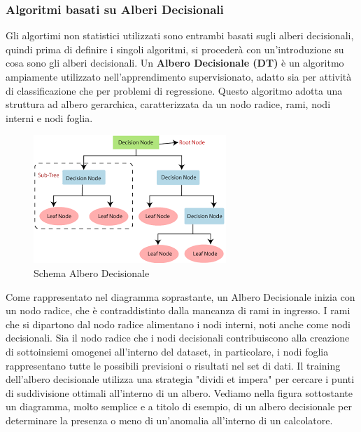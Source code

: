 \subsubsection{{Algoritmi basati su Alberi Decisionali}}
Gli algortimi non statistici utilizzati sono entrambi basati sugli alberi decisionali, quindi prima di definire i singoli algoritmi, si proceder\`a con un'introduzione su cosa sono gli alberi decisionali. Un \textbf{Albero Decisionale (DT)} \`e un algoritmo ampiamente utilizzato nell'apprendimento supervisionato, adatto sia per attivit\`a di classificazione che per problemi di regressione. Questo algoritmo adotta una struttura ad albero gerarchica, caratterizzata da un nodo radice, rami, nodi interni e nodi foglia\cite{dt}.
\begin{figure}[H]
    \centering
    \includegraphics[width=0.6\linewidth]{DT.png}
    \caption{Schema Albero Decisionale}
    \label{fig:enter-label}
\end{figure}

\vspace{1cm}

Come rappresentato nel diagramma soprastante, un Albero Decisionale inizia con un nodo radice, che \`e contraddistinto dalla mancanza di rami in ingresso. I rami che si dipartono dal nodo radice alimentano i nodi interni, noti anche come nodi decisionali.  Sia il nodo radice che i nodi decisionali contribuiscono alla creazione di sottoinsiemi omogenei all'interno del dataset, in particolare, i nodi foglia rappresentano tutte le possibili previsioni o risultati nel set di dati. 
Il training dell'albero decisionale utilizza una strategia "dividi et impera" per cercare i punti di suddivisione ottimali all'interno di un albero.
Vediamo nella figura sottostante un diagramma, molto semplice e a titolo di esempio, di un albero decisionale per determinare la presenza o meno di un'anomalia all'interno di un calcolatore. 

